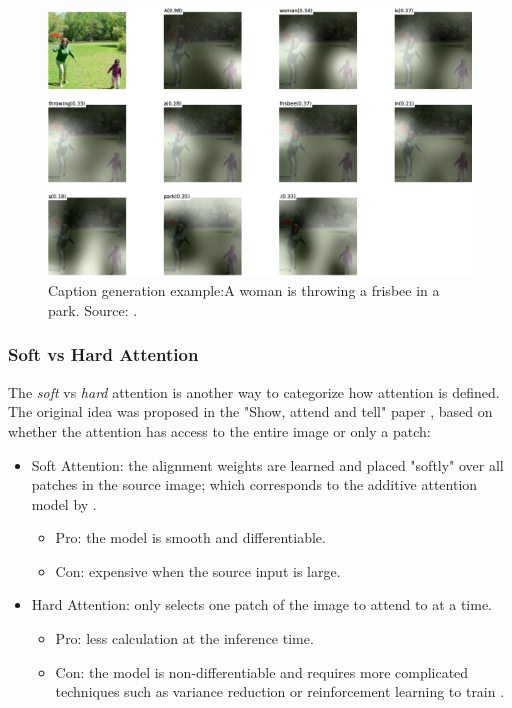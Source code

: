 \begin{figure}[hpt]
	\centering
	\includegraphics[scale=0.2]{images/ch3/visual-attention.jpg}
	\caption{Caption generation example:A woman is throwing a frisbee in a park. Source: \citep{Xu2015}.}
	\label{fig:visual-attention}
\end{figure}

\subsubsection{Soft vs Hard Attention}

The \textit{soft} vs \textit{hard} attention is another way to categorize how attention is defined. The original idea was proposed in the "Show, attend and tell" paper \citep{Xu2015}, based on whether the attention has access to the entire image or only a patch:

\begin{itemize}
    \item Soft Attention: the alignment weights are learned and placed "softly" over all patches in the source image; which corresponds to the additive attention model by \citet{Bahdanau2015}.
    \begin{itemize}
        \item Pro: the model is smooth and differentiable.
        \item Con: expensive when the source input is large.
    \end{itemize}
    \item Hard Attention: only selects one patch of the image to attend to at a time.
    \begin{itemize}
        \item Pro: less calculation at the inference time.
        \item Con: the model is non-differentiable and requires more complicated techniques such as variance reduction or reinforcement learning to train \citep{Luong2015}. 
    \end{itemize}
\end{itemize}

